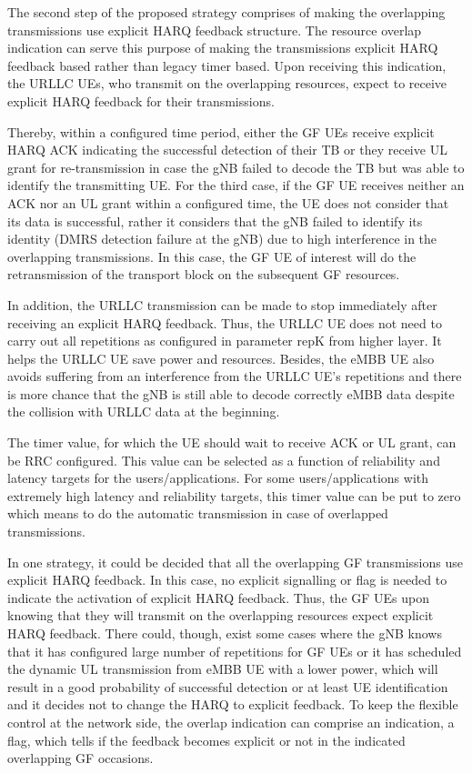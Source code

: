 \documentclass[conference]{IEEEtran}
\begin{document}
The second step of the proposed strategy comprises of making the overlapping transmissions use explicit HARQ feedback structure. The resource overlap indication can serve this purpose of making the transmissions explicit HARQ feedback based rather than legacy timer based. Upon receiving this indication, the URLLC UEs, who transmit on the overlapping resources, expect to receive explicit HARQ feedback for their transmissions. 

Thereby, within a configured time period, either the GF UEs receive explicit HARQ ACK indicating the successful detection of their TB or they receive UL grant for re-transmission in case the gNB failed to decode the TB but was able to identify the transmitting UE. For the third case, if the GF UE receives neither an ACK nor an UL grant within a configured time, the UE does not consider that its data is successful, rather it considers that the gNB failed to identify its identity (DMRS detection failure at the gNB) due to high interference in the overlapping transmissions. In this case, the GF UE of interest will do the retransmission of the transport block on the subsequent GF resources.

In addition, the URLLC transmission can be made to stop immediately after receiving an explicit HARQ feedback. Thus, the URLLC UE does not need to carry out all repetitions as configured in parameter repK from higher layer. It helps the URLLC UE save power and resources. Besides, the eMBB UE also avoids suffering from an interference from the URLLC UE’s repetitions and there is more chance that the gNB is still able to decode correctly eMBB data despite the collision with URLLC data at the beginning. 

The timer value, for which the UE should wait to receive ACK or UL grant, can be RRC configured. This value can be selected as a function of reliability and latency targets for the users/applications. For some users/applications with extremely high latency and reliability targets, this timer value can be put to zero which means to do the automatic transmission in case of overlapped transmissions.

In one strategy, it could be decided that all the overlapping GF transmissions use explicit HARQ feedback. In this case, no explicit signalling or flag is needed to indicate the activation of explicit HARQ feedback. Thus, the GF UEs upon knowing that they will transmit on the overlapping resources expect explicit HARQ feedback. There could, though, exist some cases where the gNB knows that it has configured large number of repetitions for GF UEs or it has scheduled the dynamic UL transmission from eMBB UE with a lower power, which will result in a good probability of successful detection or at least UE identification and it decides not to change the HARQ to explicit feedback. To keep the flexible control at the network side, the overlap indication can comprise an indication, a flag, which tells if the feedback becomes explicit or not in the indicated overlapping GF occasions.
\end{document}
